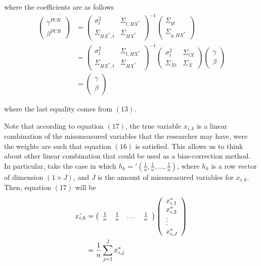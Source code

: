 \documentclass[12pt]{article}
\begin{document}
where the coefficients are as follows
\begin{align}
    \left(\begin{array}{l}
{\gamma}^{PCR} \\
{\beta}^{PCR}
\end{array}\right)&=\left(\begin{array}{cc}
{\sigma}^2_{t} & \Sigma_{t,HX^*} \\
\Sigma_{HX^*,t} & {\Sigma}_{HX^*}
\end{array}\right)^{-1}\left(\begin{array}{c}
\Sigma_{yt} \\
\Sigma_{y,HX^*}
\end{array}\right)\\
&=\left(\begin{array}{cc}
{\sigma}^2_{t} & \Sigma_{t,HX^*} \\
\Sigma_{HX^*,t} & {\Sigma}_{HX^*}
\end{array}\right)^{-1}\left(\begin{array}{cc}
{\sigma}^2_{t} & \Sigma_{tX} \\
\Sigma_{Xt} & {\Sigma}_{X}
\end{array}\right)\left(\begin{array}{l}
{\gamma} \\
{\beta}
\end{array}\right)\\
&=\left(\begin{array}{l}
{\gamma} \\
{\beta}
\end{array}\right)
\end{align}

where the last equality comes from $(13)$.

Note that according to equation $(17)$, the true variable $x_{i,k}$ is a linear combination of the missmeasured variables that the researcher may have, were the weights are such that equation $(16)$ is satisfied. This allows us to think about other linear combination that could be used as a bias-correction method. In particular, take the case in which $h_k='(\frac{1}{n},\frac{1}{n},\dots,\frac{1}{n})$, where $h_k$ is a row vector of dimension $(1\times J)$, and $J$ is the amount of missmeasured variables for $x_{i,k}$. Then, equation $(17)$ will be
\begin{align}
    \Tilde{x_{i,k}}&=\left(\begin{array}{cccc}
\frac{1}{n} & \frac{1}{n} & \dots &\frac{1}{n} 
\end{array}\right)\left(\begin{array}{l}
x^*_{i,1} \\
x^*_{i,2} \\
\vdots \\
x^*_{i,J} 
\end{array}\right)\\
&=\frac{1}{n}\sum_{j=1}^J x^*_{i,j}
\end{align}
\end{document}
